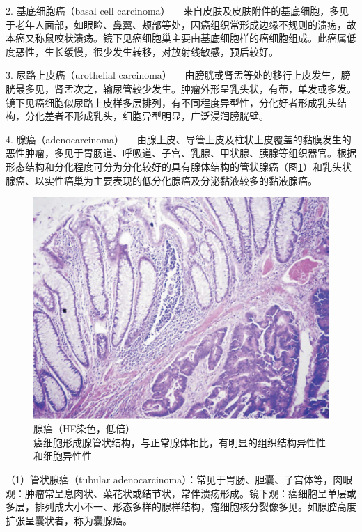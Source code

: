 {2. 基底细胞癌（basal cell carcinoma）}
　来自皮肤及皮肤附件的基底细胞，多见于老年人面部，如眼睑、鼻翼、颊部等处，因癌组织常形成边缘不规则的溃疡，故本癌又称鼠咬状溃疡。镜下见癌细胞巢主要由基底细胞样的癌细胞组成。此癌属低度恶性，生长缓慢，很少发生转移，对放射线敏感，预后较好。

{3. 尿路上皮癌（urothelial carcinoma）}
　由膀胱或肾盂等处的移行上皮发生，膀胱最多见，肾盂次之，输尿管较少发生。肿瘤外形呈乳头状，有蒂，单发或多发。镜下见癌细胞似尿路上皮样多层排列，有不同程度异型性，分化好者形成乳头结构，分化差者不形成乳头，细胞异型明显，广泛浸润膀胱壁。

{4. 腺癌（adenocarcinoma）}
　由腺上皮、导管上皮及柱状上皮覆盖的黏膜发生的恶性肿瘤，多见于胃肠道、呼吸道、子宫、乳腺、甲状腺、胰腺等组织器官。根据形态结构和分化程度可分为分化较好的具有腺体结构的管状腺癌（图\ref{fig5-15}）和乳头状腺癌、以实性癌巢为主要表现的低分化腺癌及分泌黏液较多的黏液腺癌。

\begin{figure}[!htbp]
 \centering
 \includegraphics{./images/Image00083.jpg}
 \caption{腺癌（HE染色，低倍）\\{\small 癌细胞形成腺管状结构，与正常腺体相比，有明显的组织结构异性性和细胞异性性}}
 \label{fig5-15}
  \end{figure}



（1）管状腺癌（tubular
adenocarcinoma）：常见于胃肠、胆囊、子宫体等，肉眼观：肿瘤常呈息肉状、菜花状或结节状，常伴溃疡形成。镜下观：癌细胞呈单层或多层，排列成大小不一、形态多样的腺样结构，瘤细胞核分裂像多见。如腺腔高度扩张呈囊状者，称为囊腺癌。

